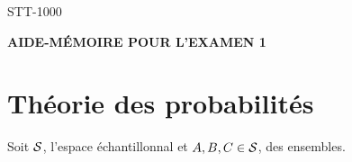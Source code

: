\documentclass[12pt,french]{article}
\begin{document}



{ STT-1000}\hfill

\begin{center}
\textbf{{AIDE-M\'EMOIRE POUR L'EXAMEN 1 \\}}
\end{center}

\section*{Th\'eorie des probabilit\'es}

Soit ${\cal S}$, l'espace \'echantillonnal et $A,B,C\in{\cal{S}}$,
des ensembles.
\end{document}
